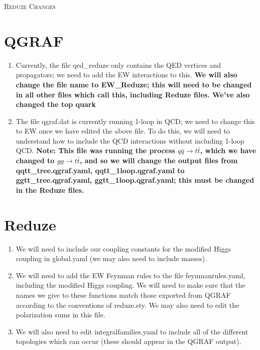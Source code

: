 \documentclass[12pt]{article}
\numberwithin{equation}{section}
\numberwithin{figure}{section}
\numberwithin{table}{section}
\begin{document}
	\begin{center}
		{\Huge \scshape Reduze Changes}
	\end{center}

	\vspace{0.5cm}
	
	\section{QGRAF}

        \begin{enumerate}
        \item Currently, the file qed\_reduze only contains the QED vertices and propagators; we need to add the EW interactions to this. \textbf{We will also change the file name to EW\_Reduze; this will need to be changed in all other files which call this, including Reduze files. We've also changed the top quark}
        \item The file qgraf.dat is currently running 1-loop in QCD; we need to change this to EW once we have edited the above file.  To do this, we will need to understand how to include the QCD interactions without including 1-loop QCD. \textbf{Note: This file was running the process \(q\bar{q}\rightarrow t\bar{t}\), which we have changed to \(gg\rightarrow t\bar{t}\), and so we will change the output files from qqtt\_tree.qgraf.yaml, qqtt\_1loop.qgraf.yaml to ggtt\_tree.qgraf.yaml, ggtt\_1loop.qgraf.yaml; this must be changed in the Reduze files.}
        \end{enumerate}

        \section{Reduze}

        \begin{enumerate}
        \item We will need to include our coupling constants for the modified Higgs coupling in global.yaml (we may also need to include masses).
        \item We will need to add the EW Feynman rules to the file feynmanrules.yaml, including the modified Higgs coupling. We will need to make sure that the names we give to these functions match those exported from QGRAF according to the conventions of reduze.sty. We may also need to edit the polarization sums in this file.
        \item We will also need to edit integralfamilies.yaml to include all of the different topologies which can occur (these should appear in the QGRAF output).
        \end{enumerate}
\end{document}
